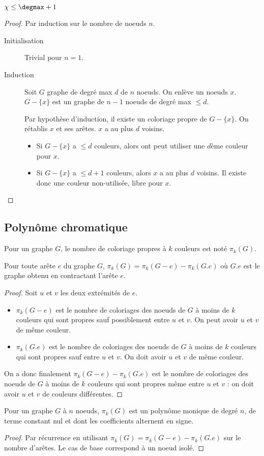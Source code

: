 \begin{mytheo}
  $\chi \leq \degmax + 1$
  \begin{proof}
    Par induction sur le nombre de noeuds $n$.
    \begin{description}
      \item[Initialisation]
        Trivial pour $n = 1$.
      \item[Induction]
        Soit $G$ graphe de degré max $d$ de $n$ noeuds. On enlève un noeuds $x$. $G-\{x\}$ est un graphe de $n-1$ noeuds de degré max $\leq d$.

        Par hypothèse d'induction, il existe un coloriage propre de $G-\{x\}$.
        On rétablis $x$ et ses arêtes. $x$ a au plus $d $ voisins.

        \begin{itemize}
          \item Si  $G-\{x\}$ a $\leq d$ couleurs, alors ont peut utiliser une $d$ème couleur pour $x$.
          \item  Si $G-\{x\}$ a $\leq d+1$ couleurs, alors $x$ a au plus $d$ voisins. Il existe donc une couleur non-utilisée, libre pour $x$.
        \end{itemize}
    \end{description}
  \end{proof}
\end{mytheo}
\subsection{Polynôme chromatique}
Pour un graphe $G$, le nombre de coloriage propres à $k$ couleurs est noté $\pi_k(G)$.
\begin{mytheo}
  Pour toute arête $e$ du graphe $G$, $\pi_k(G) = \pi_k(G-e) - \pi_k(G.e)$ où $G.e$ est le graphe obtenu en contractant l'arête $e$.
  \begin{proof}
  Soit $u$ et $v$ les deux extrémités de $e$.
	\begin{itemize}
	\item $\pi_k(G-e)$ est le nombre de coloriages des noeuds de $G$ à moins de $k$ couleurs qui sont propres sauf possiblement entre $u$ et $v$. On peut avoir $u$ et $v$ de même couleur.
	\item $\pi_k(G.e)$ est le nombre de coloriages des noeuds de $G$ à moins de $k$ couleurs qui sont propres sauf entre $u$ et $v$. On doit avoir $u$ et $v$ de même couleur.
	\end{itemize}
	On a donc finalement $\pi_k(G-e) - \pi_k(G.e)$ est le nombre de coloriages des noeuds de $G$ à moins de $k$ couleurs qui sont propres même entre $u$ et $v$ : on doit avoir $u$ et $v$ de couleurs différentes.
  \end{proof}
\end{mytheo}

\begin{mycorr} [Birkhoff]
  Pour un graphe $G$ à $n$ noeuds, $\pi_k (G)$ est un polynôme monique de degré $n$, de terme constant nul et dont les coefficients alternent en signe.
  \begin{proof}
    Par récurrence en utilisant $\pi_k(G) = \pi_k(G-e)-\pi_k(G.e)$ sur le nombre d'arêtes. Le cas de base correspond à un noeud isolé.
  \end{proof}
\end{mycorr}
